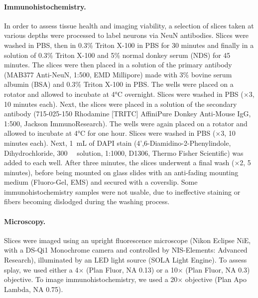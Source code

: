 \paragraph{Immunohistochemistry.} In order to assess tissue health and 
imaging viability, a selection of slices taken at various depths were 
processed to label neurons via NeuN antibodies. Slices were washed in 
PBS, then in 0.3\% Triton X-100 in PBS for 30 minutes and finally in 
a solution of 0.3\% Triton X-100 and 5\% normal donkey serum (NDS) 
for 45 minutes. The slices were then placed in a solution of the 
primary antibody (MAB377 Anti-NeuN, 1:500, EMD Millipore) made with 
3\% bovine serum albumin (BSA) and 0.3\% Triton X-100 in PBS. The 
wells were placed on a rotator and allowed to incubate at 4\si{\celsius}
overnight. Slices were washed in PBS ($\times$3, 10 minutes each). Next, the 
slices were placed in a solution of the secondary antibody 
(715-025-150 Rhodamine [TRITC] AffiniPure Donkey Anti-Mouse IgG, 1:500, 
Jackson ImmunoResearch). The wells were again placed on a rotator and 
allowed to incubate at 4\si{\celsius} for one hour. Slices were washed in 
PBS ($\times$3, 10 minutes each). Next, 1~\si{\milli\liter} of DAPI stain 
(4',6-Diamidino-2-Phenylindole, Dihydrochloride, 300~\si{\micro\Molar} solution, 
1:1000, D1306, Thermo Fisher Scientific) was added to each well. After 
three minutes, the slices underwent a final wash ($\times$2, 5 minutes), 
before being mounted on glass slides with an anti-fading mounting 
medium (Fluoro-Gel, EMS) and secured with a coverslip. Some 
immunohistochemistry samples were not usable, due to ineffective 
staining or fibers becoming dislodged during the washing process.

\paragraph{Microscopy.} Slices were imaged using an upright fluorescence 
microscope (Nikon Eclipse NiE, with a DS-Qi1 Monochrome camera and 
controlled by NIS-Elements: Advanced Research), illuminated by an LED 
light source (SOLA Light Engine). To assess splay, we 
used either a 4$\times$ (Plan Fluor, NA 0.13) or a 10$\times$ (Plan Fluor, NA 0.3) 
objective. To image immunohistochemistry, we used a 20$\times$ objective 
(Plan Apo Lambda, NA 0.75).

